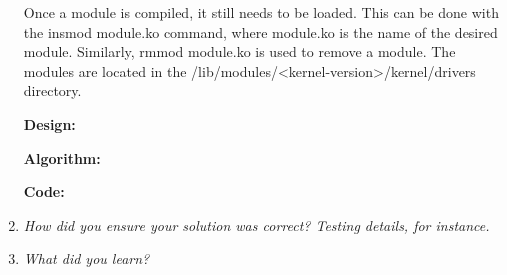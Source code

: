 \documentclass[letterpaper,10pt,titlepage]{article}
\newcommand{\tab}{\hspace*{2em}} %
\begin{document}
\begin{enumerate}
\tab Once a module is compiled, it still needs to be loaded. This can be done with the insmod module.ko command, where module.ko is the name of the desired module. Similarly, rmmod module.ko is used to remove a module. The modules are located in the /lib/modules/<kernel-version>/kernel/drivers directory.

\tab \textbf{Design:} 

\tab \textbf{Algorithm:} 

\tab \textbf{Code:}

\item \emph{How did you ensure your solution was correct? Testing details, for instance.}

\item \emph{What did you learn?}

\end{enumerate}

%
\end{document}
